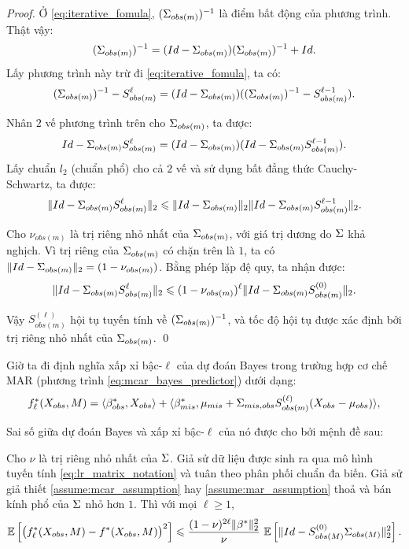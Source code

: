 \begin{proof}
    Ở \eqref{eq:iterative_fomula}, $(\Sigma_{obs(m)})^{-1}$ là điểm bất động của phương trình. Thật vậy:
    \begin{equation*}
        (\Sigma_{obs(m)})^{-1} = (Id - \Sigma_{obs(m)}) (\Sigma_{obs(m)})^{-1} + Id.
    \end{equation*}
    Lấy phương trình này trừ đi \eqref{eq:iterative_fomula}, ta có:
    \[
        (\Sigma_{obs(m)})^{-1} - S^{\ell}_{obs(m)} = (Id - \Sigma_{obs(m)})((\Sigma_{obs(m)})^{-1} - S^{\ell-1}_{obs(m)}).
    \]

    Nhân $2$ vế phương trình trên cho $\Sigma_{obs(m)}$, ta được:
    \[
        Id - \Sigma_{obs(m)} S^{\ell}_{obs(m)} = (Id - \Sigma_{obs(m)})(Id -  \Sigma_{obs(m)} S^{\ell-1}_{obs(m)}).
    \]
    Lấy chuẩn $l_2$ (chuẩn phổ) cho cả $2$ vế và sử dụng bất đẳng thức Cauchy-Schwartz, ta được:
    \[
        \|Id - \Sigma_{obs(m)} S^{\ell}_{obs(m)} \|_2 \leqslant \|Id - \Sigma_{obs(m)}\|_2 \|Id -  \Sigma_{obs(m)} S^{\ell-1}_{obs(m)}\|_2.
    \]

    Cho $\nu_{obs(m)}$ là trị riêng nhỏ nhất của $\Sigma_{obs(m)}$, với giá trị dương do $\Sigma$ khả nghịch. Vì trị riêng của $\Sigma_{obs(m)}$ có chặn trên là $1$, ta có $\| Id - \Sigma_{obs(m)} \|_2 = (1 - \nu_{obs(m)})$. Bằng phép lặp đệ quy, ta nhận được:
    \begin{equation}\label{eq:iteration_converge_bound}
        \|Id - \Sigma_{obs(m)} S_{obs(m)}^{\ell}\|_2 
        \leqslant (1 - \nu_{obs(m)})^{\ell} \|Id - \Sigma_{obs(m)} S_{obs(m)}^{(0)}\|_2.
    \end{equation}
    

    Vậy $S_{obs(m)}^{(\ell)}$ hội tụ tuyến tính về $(\Sigma_{obs(m)})^{-1}$, và tốc độ hội tụ được xác định bởi trị riêng nhỏ nhất của $\Sigma_{obs(m)}$.  \qed
\end{proof}


Giờ ta đi định nghĩa xấp xỉ bậc-$\ell$ của dự đoán Bayes trong trường hợp cơ chế MAR (phương trình \eqref{eq:mcar_bayes_predictor}) dưới dạng:
\begin{equation}\label{eq:l_approximation_mcar_bayes_predictor}
    f_{\ell}^* (X_{obs}, M) = \langle\beta_{obs}^{*},X_{obs} \rangle+\langle\beta_{mis}^{*},\mu_{mis} + \Sigma_{mis,obs} S_{obs(m)}^{(\ell)}(X_{obs}-\mu_{obs})\rangle,
\end{equation}

Sai số giữa dự đoán Bayes và xấp xỉ bậc-$\ell$ của nó được cho bởi mệnh đề sau:
\begin{prop}\label{prop:error_approximation}
   Cho $\nu$ là trị riêng nhỏ nhất của $\Sigma$. Giả sử dữ liệu được sinh ra qua mô hình tuyến tính \eqref{eq:lr_matrix_notation} và tuân theo phân phối chuẩn đa biến. Giả sử giả thiết \ref{assume:mcar_assumption} hay \ref{assume:mar_assumption} thoả và bán kính phổ của $\Sigma$ nhỏ hơn $1$. Thì với mọi $\ell \geq 1$,
   \begin{equation}\label{eq:aprrox_error}
       \mathbb{E} \left[\left(f_{\ell}^* (X_{obs}, M) - f^* (X_{obs}, M)\right)^2\right] 
       \leqslant \dfrac{(1-\nu)^{2\ell} \|\beta^*\|_2^2}{\nu} \ \mathbb{E}\left[ \|Id - S_{obs(M)}^{(0)} \Sigma_{obs(M)}\|_2^2\right].
   \end{equation}
\end{prop}

